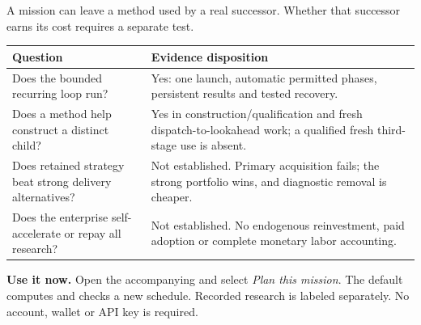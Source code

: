 \begin{insight}
A mission can leave a method used by a real successor. Whether that successor earns its cost requires a separate test.
\end{insight}

\begin{tabularx}{\linewidth}{L{55mm}Y}
\toprule
Question & Evidence disposition \\
\midrule
Does the bounded recurring loop run? & Yes: one launch, automatic permitted phases, persistent results and tested recovery. \\
Does a method help construct a distinct child? & Yes in construction/qualification and fresh dispatch-to-lookahead work; a qualified fresh third-stage use is absent. \\
Does retained strategy beat strong delivery alternatives? & Not established. Primary acquisition fails; the strong portfolio wins, and diagnostic removal is cheaper. \\
Does the enterprise self-accelerate or repay all research? & Not established. No endogenous reinvestment, paid adoption or complete monetary labor accounting. \\
\bottomrule
\end{tabularx}

\vspace{2mm}
{\small\textbf{Use it now.} Open the accompanying  and select \emph{Plan this mission}. The default computes and checks a new schedule. Recorded research is labeled separately. No account, wallet or API key is required.}
